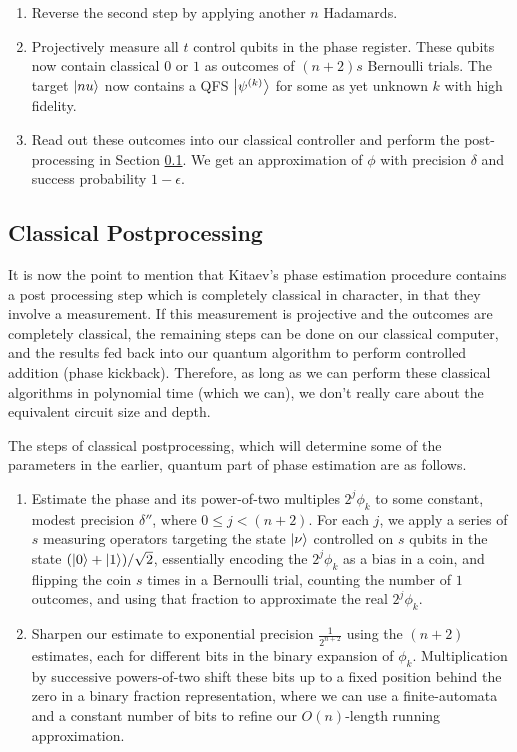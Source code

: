 \begin{enumerate}
\item Reverse the second step by applying another $n$ Hadamards.

\item Projectively measure all $t$ control
qubits in the phase register. These qubits
now contain classical $0$ or $1$ as outcomes of $(n+2)s$ Bernoulli trials.
The target $\left\vert{nu}\right\rangle$ now contains a QFS $\left\vert{\psi^{(k)}}\right\rangle$ for some
as yet unknown $k$ with high fidelity.

\item Read out these outcomes into our classical controller
and perform the post-processing in Section \ref{subsec:ksv-classical}.
We get an approximation of $\phi$ with precision $\delta$ and
success probability $1-\epsilon$.

\end{enumerate}

\subsection{Classical Postprocessing}
\label{subsec:ksv-classical}

It is now the point to mention that Kitaev's phase estimation procedure
contains a post processing step which is completely classical in
character, in that they involve a measurement. If this measurement is
projective and the outcomes are completely classical, the remaining steps
can be done on our classical computer,
and the results fed back into our quantum algorithm to perform controlled
addition (phase kickback). Therefore, as long as we can perform these classical
algorithms in polynomial time (which we can), we don't really care
about the equivalent circuit size and depth.

The steps of classical postprocessing, which will determine some of the
parameters in the earlier, quantum part of phase estimation are as follows.

\begin{enumerate}

\item
Estimate the phase and its power-of-two multiples
$2^j \phi_k$ to
some constant, modest precision $\delta''$, where
$0 \le j < (n+2)$. For each $j$, we
apply a series of $s$ measuring operators targeting the state $\left\vert{\nu}\right\rangle$
controlled on $s$ qubits in the state $(\left\vert{0}\right\rangle+\left\vert{1}\right\rangle)/\sqrt{2}$,
essentially encoding the $2^j \phi_k$ as a bias in a coin, and flipping the
coin $s$ times in a Bernoulli trial, counting the number of $1$ outcomes,
and using that fraction to approximate the real $2^j \phi_k$.
\item
Sharpen our estimate to exponential precision $\frac{1}{2^{n+2}}$ using the
$(n+2)$ estimates, each for different bits in the binary expansion of
$\phi_k$. Multiplication by successive powers-of-two shift these bits
up to a fixed position behind the zero in a binary fraction representation,
where we can use a finite-automata and a constant number of
bits to refine our $O(n)$-length running approximation.
\end{enumerate}

